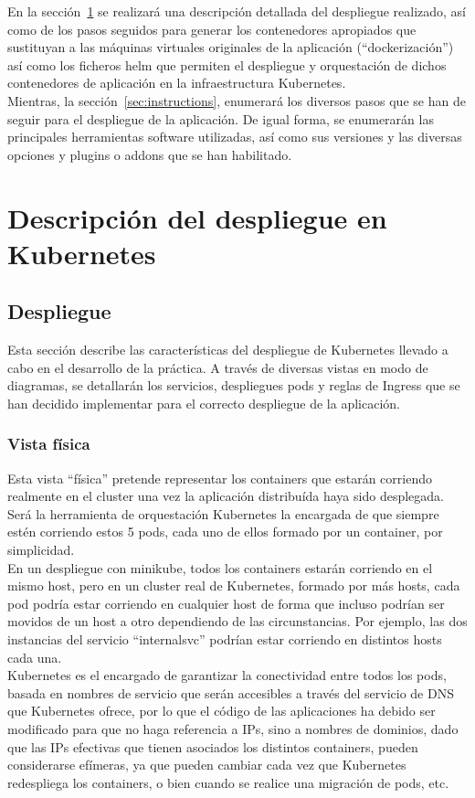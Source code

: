 \documentclass[12pt,spanish]{article}
\begin{document}
En la sección~\ref{sec:deployment} se realizará una descripción detallada del despliegue realizado, así como de los pasos seguidos para generar los contenedores apropiados que sustituyan a las máquinas virtuales originales de la aplicación (``dockerización'') así como los ficheros helm que permiten el despliegue y orquestación de dichos contenedores de aplicación en la infraestructura Kubernetes.\\

Mientras, la sección~\ref{sec:instructions}, enumerará los diversos pasos que se han de seguir para el despliegue de la aplicación. De igual forma, se enumerarán las principales herramientas software utilizadas, así como sus versiones y las diversas opciones y plugins o addons que se han habilitado.

\pagebreak
\section{Descripción del despliegue en Kubernetes}
\label{sec:deployment}

\subsection{Despliegue}

Esta sección describe las características del despliegue de Kubernetes llevado a cabo en el desarrollo de la práctica. A través de diversas vistas en modo de diagramas, se detallarán los servicios, despliegues pods y reglas de Ingress que se han decidido implementar para el correcto despliegue de la aplicación.

\subsubsection{Vista física}

Esta vista ``física'' pretende representar los containers que estarán corriendo realmente en el cluster una vez la aplicación distribuída haya sido desplegada. Será la herramienta de orquestación Kubernetes la encargada de que siempre estén corriendo estos 5 pods, cada uno de ellos formado por un container, por simplicidad.\\
En un despliegue con minikube, todos los containers estarán corriendo en el mismo host, pero en un cluster real de Kubernetes, formado por  más hosts, cada pod podría estar corriendo en cualquier host de forma que incluso podrían ser movidos de un host a otro dependiendo de las circunstancias. Por ejemplo, las dos instancias del servicio “internalsvc” podrían estar corriendo en distintos hosts cada una.\\
Kubernetes es el encargado de garantizar la conectividad entre todos los pods, basada en nombres de servicio que serán accesibles a través del servicio de DNS que Kubernetes ofrece, por lo que el código de las aplicaciones ha debido ser modificado para que no haga referencia a IPs, sino a nombres de dominios, dado que las IPs efectivas que tienen asociados los distintos containers, pueden considerarse efímeras, ya que pueden cambiar cada vez que Kubernetes redespliega los containers, o bien cuando se realice una migración de pods, etc.
\end{document}
